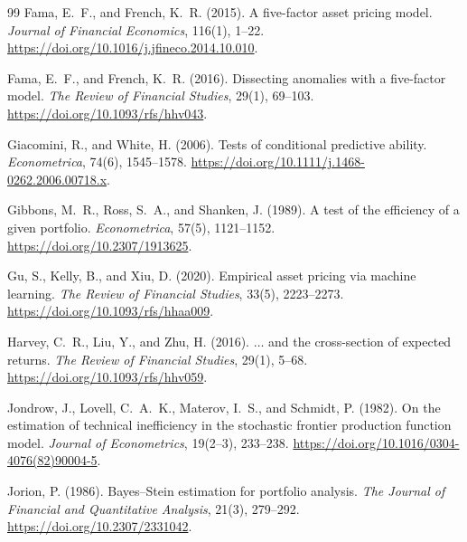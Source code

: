 \documentclass[11pt]{article}
\begin{document}
\begin{thebibliography}{99}
Fama, E.\ F., and French, K.\ R. (2015).
A five-factor asset pricing model.
\textit{Journal of Financial Economics}, 116(1), 1--22.
\href{https://doi.org/10.1016/j.jfineco.2014.10.010}{https://doi.org/10.1016/j.jfineco.2014.10.010}.

Fama, E.\ F., and French, K.\ R. (2016).
Dissecting anomalies with a five-factor model.
\textit{The Review of Financial Studies}, 29(1), 69--103.
\href{https://doi.org/10.1093/rfs/hhv043}{https://doi.org/10.1093/rfs/hhv043}.

Giacomini, R., and White, H. (2006).
Tests of conditional predictive ability.
\textit{Econometrica}, 74(6), 1545--1578.
\href{https://doi.org/10.1111/j.1468-0262.2006.00718.x}{https://doi.org/10.1111/j.1468-0262.2006.00718.x}.

Gibbons, M.\ R., Ross, S.\ A., and Shanken, J. (1989).
A test of the efficiency of a given portfolio.
\textit{Econometrica}, 57(5), 1121--1152.
\href{https://doi.org/10.2307/1913625}{https://doi.org/10.2307/1913625}.

Gu, S., Kelly, B., and Xiu, D. (2020).
Empirical asset pricing via machine learning.
\textit{The Review of Financial Studies}, 33(5), 2223--2273.
\href{https://doi.org/10.1093/rfs/hhaa009}{https://doi.org/10.1093/rfs/hhaa009}.

Harvey, C.\ R., Liu, Y., and Zhu, H. (2016).
$\ldots$ and the cross-section of expected returns.
\textit{The Review of Financial Studies}, 29(1), 5--68.
\href{https://doi.org/10.1093/rfs/hhv059}{https://doi.org/10.1093/rfs/hhv059}.

Jondrow, J., Lovell, C.\ A.\ K., Materov, I.\ S., and Schmidt, P. (1982).
On the estimation of technical inefficiency in the stochastic frontier
production function model.
\textit{Journal of Econometrics}, 19(2--3), 233--238.
\href{https://doi.org/10.1016/0304-4076(82)90004-5}{https://doi.org/10.1016/0304-4076(82)90004-5}.

Jorion, P. (1986).
Bayes--Stein estimation for portfolio analysis.
\textit{The Journal of Financial and Quantitative Analysis}, 21(3), 279--292.
\href{https://doi.org/10.2307/2331042}{https://doi.org/10.2307/2331042}.


\end{thebibliography}
\end{document}
